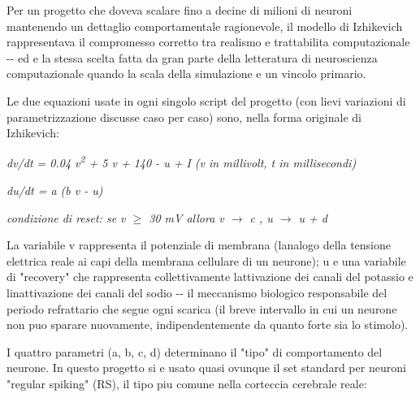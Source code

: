 \documentclass[
  italian,
]{article}
\begin{document}
Per un progetto che doveva scalare fino a decine di milioni di neuroni mantenendo un dettaglio comportamentale ragionevole, il modello di Izhikevich rappresentava il compromesso corretto tra realismo e trattabilita\textquotesingle{} computazionale -\/- ed e\textquotesingle{} la stessa scelta fatta da gran parte della letteratura di neuroscienza computazionale quando la scala della simulazione e\textquotesingle{} un vincolo primario.

Le due equazioni usate in ogni singolo script del progetto (con lievi variazioni di parametrizzazione discusse caso per caso) sono, nella forma originale di Izhikevich:

\emph{dv/dt = 0.04 v\textsuperscript{2} + 5 v + 140 - u + I (v in millivolt, t in millisecondi)}

\emph{du/dt = a (b v - u)}

\emph{condizione di reset: se v $\geq$ 30 mV allora v $\rightarrow$ c , u $\rightarrow$ u + d}

La variabile v rappresenta il potenziale di membrana (l\textquotesingle analogo della tensione elettrica reale ai capi della membrana cellulare di un neurone); u e\textquotesingle{} una variabile di "recovery" che rappresenta collettivamente l\textquotesingle attivazione dei canali del potassio e l\textquotesingle inattivazione dei canali del sodio -\/- il meccanismo biologico responsabile del periodo refrattario che segue ogni scarica (il breve intervallo in cui un neurone non puo\textquotesingle{} sparare nuovamente, indipendentemente da quanto forte sia lo stimolo).

I quattro parametri (a, b, c, d) determinano il "tipo" di comportamento del neurone. In questo progetto si e\textquotesingle{} usato quasi ovunque il set standard per neuroni "regular spiking" (RS), il tipo piu\textquotesingle{} comune nella corteccia cerebrale reale:
\end{document}
